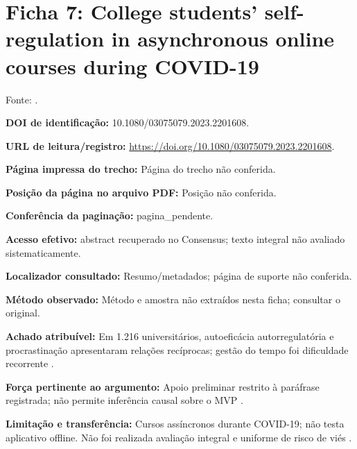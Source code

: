 \clearpage\section*{Ficha 7: College students’ self-regulation in asynchronous online courses during COVID-19}

Fonte: \citet{education_han2023}.

\noindent\textbf{DOI de identificação:} 10.1080/03075079.2023.2201608.\par\medskip

\noindent\textbf{URL de leitura/registro:} \url{https://doi.org/10.1080/03075079.2023.2201608}.\par\medskip

\noindent\textbf{Página impressa do trecho:} Página do trecho não conferida.\par\medskip

\noindent\textbf{Posição da página no arquivo PDF:} Posição não conferida.\par\medskip

\noindent\textbf{Conferência da paginação:} pagina\_pendente.\par\medskip

\noindent\textbf{Acesso efetivo:} abstract recuperado no Consensus; texto integral não avaliado sistematicamente.\par\medskip

\noindent\textbf{Localizador consultado:} Resumo/metadados; página de suporte não conferida.\par\medskip

\noindent\textbf{Método observado:} Método e amostra não extraídos nesta ficha; consultar o original.\par\medskip

\noindent\textbf{Achado atribuível:} Em 1.216 universitários, autoeficácia autorregulatória e procrastinação apresentaram relações recíprocas; gestão do tempo foi dificuldade recorrente \citep{education_han2023}.\par\medskip

\noindent\textbf{Força pertinente ao argumento:} Apoio preliminar restrito à paráfrase registrada; não permite inferência causal sobre o MVP \citep{education_han2023}.\par\medskip

\noindent\textbf{Limitação e transferência:} Cursos assíncronos durante COVID-19; não testa aplicativo offline. Não foi realizada avaliação integral e uniforme de risco de viés \citep{education_han2023}.\par\medskip

